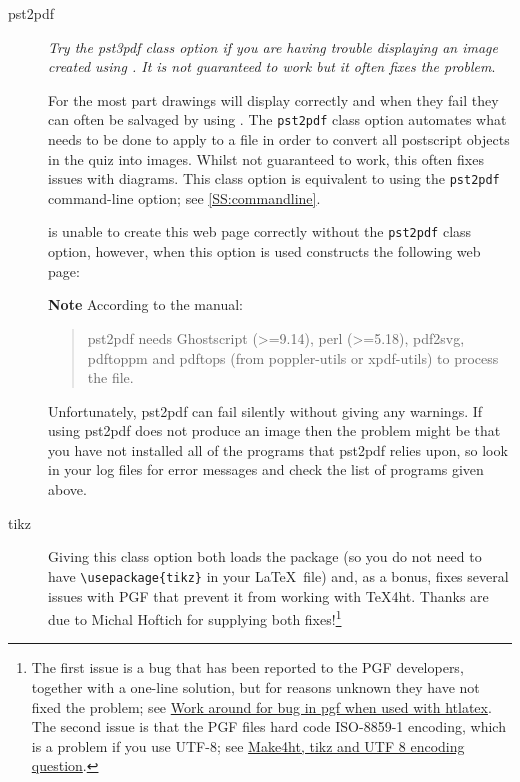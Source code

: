 \documentclass[svgnames]{article}
\begin{document}
\begin{description}
  \item[pst2pdf] 
    \textit{Try the pst3pdf class option if you are having trouble
    displaying an image created using . It is not
    guaranteed to work but it often fixes the problem}.

    For the most part  drawings will display correctly and
    when they fail they can often be salvaged by using . The
    \Verb|pst2pdf| class option automates what needs to be done to apply
     to a \MathQuiz file in order to convert all postscript objects in the
    quiz into images. Whilst not guaranteed to work, this often fixes
    issues with  diagrams. This class option is
    equivalent to using the \Verb|pst2pdf| command-line option; see
    \autoref{SS:commandline}.

    

    \MathQuiz is unable to create this web page correctly without the
    \Verb|pst2pdf| class option, however, when this option is used
    \MathQuiz constructs the following web page:


    \noindent
    \textbf{Note} According to the  manual:

    \begin{quote}
      \textsf{pst2pdf} needs Ghostscript (>=9.14), perl (>=5.18), pdf2svg, pdftoppm
      and pdftops (from poppler-utils or xpdf-utils) to process the file.
    \end{quote}

    Unfortunately, \textsf{pst2pdf} can fail silently without giving any warnings. If
    using \textsf{pst2pdf} does not produce an image then the problem
    might be that you have not installed all of the programs that
    \textsf{pst2pdf} relies upon, so look in your log files for error
    messages and check the list of programs given above.

  \item[tikz]
    Giving this class option both loads the  package (so
    you do not need to have \Verb|\usepackage{tikz}| in your \LaTeX\ file)
    and, as a bonus, fixes several issues with PGF that prevent it from
    working with \TeX 4ht. Thanks are due to Michal Hoftich for supplying
    both fixes!\footnote{The first issue is a bug that has been reported
    to the PGF developers, together with a one-line solution, but for
    reasons unknown they have not fixed the problem; see
    \href{https://tex.stackexchange.com/questions/386757}{Work around for
    bug in pgf when used with htlatex}.  The second issue is that the PGF
    files hard code \textsf{ISO-8859-1} encoding, which is a problem if
    you use UTF-8; see
    \href{https://tex.stackexchange.com/questions/390421}{Make4ht, tikz
    and UTF 8 encoding question}.  }


\end{description}
\end{document}

